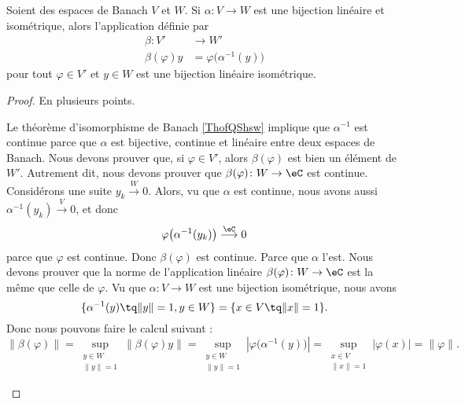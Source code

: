 \begin{lemma}       \label{LEMooWEMFooEHIaxY}
Soient des espaces de Banach \( V\) et \( W\). Si \( \alpha\colon V\to W\) est une bijection linéaire et isométrique, alors l'application définie par
\begin{equation}        \label{EQooTSVHooEQGuNw}
    \begin{aligned}
        \beta\colon V'  & \to W'                             \\
        \beta(\varphi)y & =\varphi\big( \alpha^{-1}(y) \big)
    \end{aligned}
\end{equation}
pour tout \( \varphi\in V'\) et \( y\in W\) est une bijection linéaire isométrique.
\end{lemma}

\begin{proof}
En plusieurs points.
\begin{subproof}
    Le théorème d'isomorphisme de Banach \ref{ThofQShsw} implique que \( \alpha^{-1}\) est continue parce que \( \alpha\) est bijective, continue et linéaire entre deux espaces de Banach.
    Nous devons prouver que, si \( \varphi\in V'\), alors \( \beta(\varphi)\) est bien un élément de \( W'\). Autrement dit, nous devons prouver que \(  \beta(\varphi)\colon W\to \eC   \) est continue. Considérons une suite \( y_k\stackrel{W}{\longrightarrow}0\). Alors, vu que \( \alpha\) est continue, nous avons aussi \( \alpha^{-1}(y_k)\stackrel{V}{\longrightarrow}0\), et donc
    \begin{equation}
        \varphi\big( \alpha^{-1}(y_k) \big)\stackrel{\eC}{\longrightarrow}0
    \end{equation}
    parce que \( \varphi\) est continue. Donc \( \beta(\varphi)\) est continue.
    Parce que \( \alpha\) l'est.
    Nous devons prouver que la norme de l'application linéaire \( \beta(\varphi)\colon W\to \eC\) est la même que celle de \( \varphi\). Vu que \( \alpha\colon V\to W\) est une bijection isométrique, nous avons
    \begin{equation}
        \{ \alpha^{-1}(y)\tq \| y \|=1,y\in W \}=\{ x\in V\tq \|x  \|=1 \}.
    \end{equation}
    Donc nous pouvons faire le calcul suivant :
    \begin{equation}
        \| \beta(\varphi) \|=\sup_{\substack{y\in W\\\| y \|=1}}\| \beta(\varphi)y \|
        =\sup_{\substack{y\in W\\\| y \|=1}}| \varphi\big( \alpha^{-1}(y) \big) |
        =\sup_{\substack{x\in V\\\| x \|=1}}| \varphi(x) |
        =\| \varphi \|.
    \end{equation}
\end{subproof}
\end{proof}

